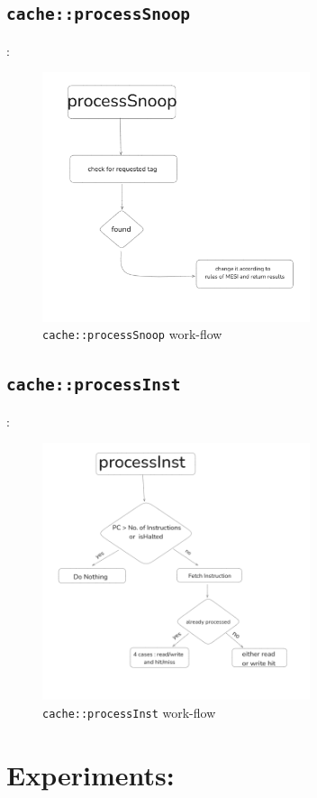 \documentclass{article}
\begin{document}
\subsection{\texttt{cache::processSnoop}} :
\begin{figure}[h]
  \centering
  \includegraphics[width=0.7\textwidth]{processSnoop.png}
  \caption{\texttt{cache::processSnoop} work-flow}
  \label{fig:arch}
\end{figure}
\subsection{\texttt{cache::processInst}} :
\begin{figure}[h]
  \centering
  \includegraphics[width=0.7\textwidth]{processInst.png}
  \caption{\texttt{cache::processInst} work-flow}
  \label{fig:arch}
\end{figure}
\section{Experiments:}
\end{document}
